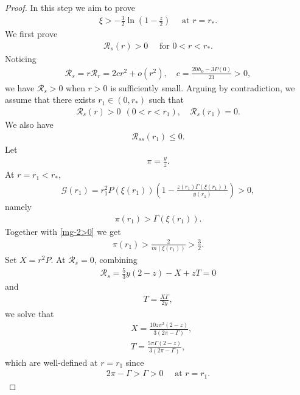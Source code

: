 \documentclass{article}
\theoremstyle{definition} \theoremstyle{remark}
\numberwithin{equation}{section}
\newcommand{\G}{\mathcal{G}}
\newcommand{\cR}{\mathcal{R}}
\begin{document}
\begin{proof}
	\vskip0.12in
 In this step we aim to prove
		\begin{align} \label{talenti}
			\xi > -\frac{3}{2}\ln\left(1 - \frac{z}{2}\right) \quad \text{ at }r = r_*.
		\end{align}
We first prove
		\begin{align} \label{cRs>0}
			\cR_s(r) > 0 \quad \text{ for } 0 < r < r_*.
		\end{align}
		Noticing
		\begin{align*}
			\cR_s = r\cR_r = 2cr^2 + o(r^2), \quad c = \frac{20h_0 - 3P(0)}{21} > 0,
		\end{align*}
		we have $\cR_s > 0$ when $r > 0$ is sufficiently small. Arguing by contradiction, we assume that there exists $r_1 \in (0,r_*)$ such that
		\begin{align*}
			\cR_s(r) > 0 ~~ (0 < r < r_1), \quad \cR_s(r_1) = 0.
		\end{align*}
		We also have
		\begin{align*}
			\cR_{ss}(r_1) \le 0.
		\end{align*}
Let
		\begin{align*}
			\pi = \frac{y}{z}.
		\end{align*}
		At $r = r_1 < r_*$,
		\begin{align*}
			\G(r_1) = r_1^2P(\xi(r_1))\left(1 - \frac{z(r_1)\Gamma(\xi(r_1))}{y(r_1)}\right) > 0,
		\end{align*}
		namely
		\begin{align*}
			\pi(r_1) > \Gamma(\xi(r_1)).
		\end{align*}
		Together with \eqref{mg-2>0} we get
		\begin{align} \label{eqofpi>}
			\pi(r_1) > \frac{2}{m(\xi(r_1))} > \frac{3}{2}.
		\end{align}
		Set $X = r^2P$. At $\cR_s = 0$, combining
		\begin{align*}
			\cR_s = \frac{5}{3}y(2-z) - X + zT = 0
		\end{align*}
		and
		\begin{align*}
			T = \frac{X\Gamma}{2y},
		\end{align*}
		we solve that
		\begin{align}
			& X = \frac{10z\pi^2(2-z)}{3(2\pi - \Gamma)}, \\
			& T = \frac{5\pi \Gamma(2-z)}{3(2\pi - \Gamma)}, \label{solvingT}
		\end{align}
		which are well-defined at $r = r_1$ since
		\begin{align} \label{2pi-G>0}
			2\pi - \Gamma > \Gamma > 0 \quad \text{ at } r = r_1.

\end{align}
\end{proof}
\end{document}
